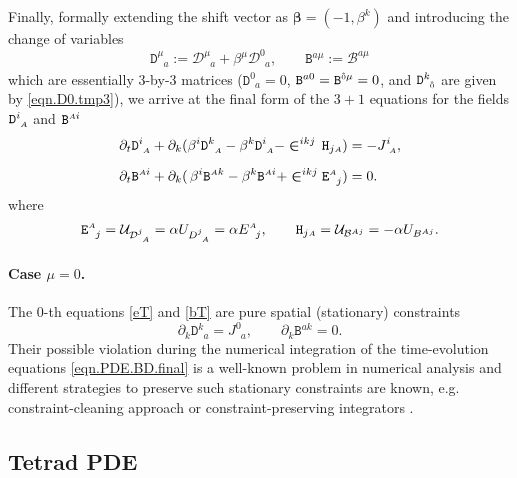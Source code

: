 \documentclass[
10pt, %
a4paper, %
oneside, %
headinclude,footinclude, %
BCOR5mm, %
]{scrartcl}
\newcommand{\sA}{\mathsmaller A}
\newcommand{\pd}[1]{\partial_{#1}}
\newcommand{\ET}[2]{E^{#1}_{\phantom{#1}#2}}	%
\newcommand{\Dm}[2]{D_{\phantom{#2}#1}^{#2}}	%
\newcommand{\aD}[2]{\mathcal{D}_{\phantom{#2}#1}^{#2}}	%
\newcommand{\Dfin}[2]{\mathtt{D}_{\phantom{#2}#1}^{#2}}	%
\newcommand{\Hfin}[2]{\mathtt{H}_{#2#1}}	%
\newcommand{\Efin}[2]{\mathtt{E}^{#1}_{\phantom{#1}#2}}	%
\newcommand{\Bm}[2]{B^{#1#2}}	%
\newcommand{\aB}[2]{\mathcal{B}^{#1#2}}	%
\newcommand{\Bfin}[2]{\mathtt{B}^{#1#2}}	%
\newcommand{\Um}{U}%
\newcommand{\aU}{\mathcal{U}}%
\newcommand{\LCsymb}{\bm{\in}}    %
\newcommand{\NC}[2]{J^{#2}_{\phantom{#2}#1}}
\newcommand{\indalg}[1]{\hat{\mathsmaller{#1}}}
\newcommand{\shift}[1]{\beta^{#1}}
\begin{document}
Finally, formally extending the shift vector as $ \bm{\beta}=(-1,\beta^{k}) $ and introducing the 
change of variables
\begin{equation}\label{eqn.varDB.final}
	\Dfin{a}{\mu} := \aD{a}{\mu} + \beta^{\mu} \aD{a}{0}, \qquad \Bfin{a}{\mu} := \aB{a}{\mu}
\end{equation}
which are essentially $ 3 $-by-$ 3 $ matrices ($ \Dfin{a}{0} = 0$, $ \Bfin{a}{0} = 
\Bfin{\indalg{0}}{\mu} = 0 $, and $ \Dfin{\indalg{0}}{k} $ are given by \eqref{eqn.D0.tmp3}),
we arrive at the final form of the $ 3+1 $ equations for the fields $ \Dfin{\sA}{i} $ and $ 
\Bfin{\sA}{i} $
\begin{subequations}\label{eqn.PDE.BD.final}
	\begin{align}
		\pd{t} \Dfin{\sA}{i} + \pd{k}(\shift{i} 
		\Dfin{\sA}{k} - \shift{k}\Dfin{\sA}{i}  - \LCsymb^{ikj} \,
		\Hfin{\sA}{j}) & 
		= -\NC{\sA}{i}, \label{eqn.tpo.D}\\[2mm]
		\pd{t} \Bfin{\sA}{i} + \pd{k}(\,\shift{i} 
		\Bfin{\sA}{k} - \shift{k}\Bfin{\sA}{i}  + \LCsymb^{ikj} 
		\Efin{\sA}{j}) & 
		= 0\label{eqn.tpo.B} .
	\end{align}
\end{subequations}
where
\begin{equation}\label{eqn.HE.fin}
	\Efin{\sA}{j} = \aU_{\aD{\sA}{j}} = \alpha \Um_{\Dm{\sA}{j}}= \alpha \ET{\sA}{j},
	\qquad
	\Hfin{\sA}{j} = \aU_{\aB{\sA}{j}} =-\alpha \Um_{\Bm{\sA}{j}}.
\end{equation}




\paragraph{Case $ \mu = 0 $.} 

The $ 0 $-th equations \eqref{eT} and \eqref{bT} are pure spatial (stationary) constraints
\begin{equation}\label{eqn.div.constr}
	\pd{k} \Dfin{a}{k} = \NC{a}{0}, 
	\qquad
	\pd{k} \Bfin{a}{k} = 0.
\end{equation}
Their possible violation during the numerical integration of the time-evolution equations 
\eqref{eqn.PDE.BD.final} is a well-known problem in numerical analysis and different strategies to 
preserve such stationary constraints   
are known, e.g. constraint-cleaning approach \cite{Munz2000,Dedneretal,Dumbser2019} or 
constraint-preserving 
integrators 
\cite{Olivares2022,SIGPR2021}.


\subsection{Tetrad PDE}
\end{document}
